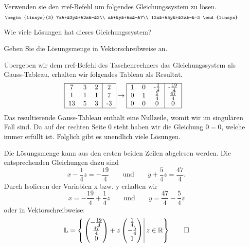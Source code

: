 Verwenden sie den rref-Befehl um folgendes Gleichungssystem zu lösen.
\[
\begin{linsys}{3}
7x&+&3y&+&2z&=&2\\
x&+&y&+&z&=&7\\
13x&+&5y&+&3z&=&-3
\end{linsys}
\qquad
\]
\begin{teilaufgaben}
\item
Wie viele Lösungen hat dieses Gleichungssystem?
\item
Geben Sie die Lösungsmenge in Vektorschreibweise an.
\end{teilaufgaben}
\begin{loesung}
\begin{teilaufgaben}
\item
Übergeben wir dem rref-Befehl des Taschenrechners das Gleichungssystem
als Gauss-Tableau, erhalten wir folgendes Tableau als Resultat.
\begin{align*}
\begin{tabular}{|ccc|c|}
\hline
7&3&2&2\\
1&1&1&7\\
13&5&3&-3\\
\hline
\end{tabular}
&
\rightarrow
\begin{tabular}{|ccc|c|}
\hline
1&0&-$\frac{1}{4}$&-$\frac{19}{4}$\\
0&1&$\frac{5}{4}$&$\frac{47}{4}$\\
0&0&0&0\\
\hline
\end{tabular}
\end{align*}
Das resultierende Gauss-Tableau enthält eine Nullzeile, womit wir im singulären Fall sind.
Da auf der rechten Seite 0 steht haben wir die Gleichung $0=0$, welche immer erfüllt ist.
Folglich gibt es unendlich viele Lösungen. 
\item
Die Lösungsmenge kann aus den ersten beiden
Zeilen abgelesen werden. Die entsprechenden Gleichungen dazu sind
\[
x-\frac{1}{4}z = -\frac{19}{4}\qquad\text{und}\qquad y+\frac{5}{4}z = \frac{47}{4}.
\]
Durch Isolieren der Variablen x bzw. y erhalten wir
\[
x = -\frac{19}{4} +\frac{1}{4}z\qquad\text{und}\qquad y = \frac{47}{4} -\frac{5}{4}z
\]
oder in Vektorschreibweise:
\[
\mathbb L =\left\{\left.
 \begin{pmatrix}
-\frac{19}{4}\\\frac{47}{4}\\0
\end{pmatrix}
+z\begin{pmatrix}
\frac{1}{4}\\-\frac{5}{4}\\1
\end{pmatrix}\right | z\in \mathbb R
\right\}
\qedhere
\]
\end{teilaufgaben}
\end{loesung}

